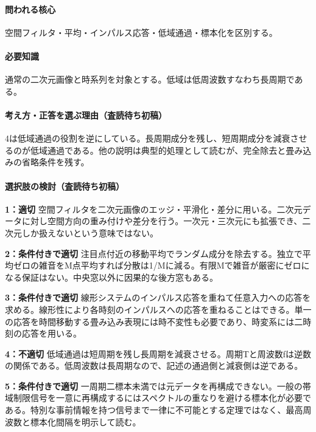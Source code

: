 \paragraph{問われる核心} 空間フィルタ・平均・インパルス応答・低域通過・標本化を区別する。

\paragraph{必要知識} 通常の二次元画像と時系列を対象とする。低域は低周波数すなわち長周期である。

\paragraph{考え方・正答を選ぶ理由（査読待ち初稿）} 4は低域通過の役割を逆にしている。長周期成分を残し、短周期成分を減衰させるのが低域通過である。他の説明は典型的処理として読むが、完全除去と畳み込みの省略条件を残す。

\paragraph{選択肢の検討（査読待ち初稿）}\mbox{}\par

\noindent\textbf{1：適切} 空間フィルタを二次元画像のエッジ・平滑化・差分に用いる。二次元データに対し空間方向の重み付けや差分を行う。一次元・三次元にも拡張でき、二次元しか扱えないという意味ではない。\par

\noindent\textbf{2：条件付きで適切} 注目点付近の移動平均でランダム成分を除去する。独立で平均ゼロの雑音をM点平均すれば分散は1/Mに減る。有限Mで雑音が厳密にゼロになる保証はない。中央窓以外に因果的な後方窓もある。\par

\noindent\textbf{3：条件付きで適切} 線形システムのインパルス応答を重ねて任意入力への応答を求める。線形性により各時刻のインパルスへの応答を重ねることはできる。単一の応答を時間移動する畳み込み表現には時不変性も必要であり、時変系には二時刻の応答を用いる。\par

\noindent\textbf{4：不適切} 低域通過は短周期を残し長周期を減衰させる。周期Tと周波数fは逆数の関係である。低周波数は長周期なので、記述の通過側と減衰側は逆である。\par

\noindent\textbf{5：条件付きで適切} 一周期二標本未満では元データを再構成できない。一般の帯域制限信号を一意に再構成するにはスペクトルの重なりを避ける標本化が必要である。特別な事前情報を持つ信号まで一律に不可能とする定理ではなく、最高周波数と標本化間隔を明示して読む。\par

